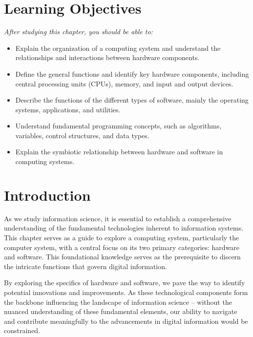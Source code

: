 \documentclass[
  letterpaper,
  DIV=11,
  numbers=noendperiod]{scrreprt}
\providecommand{\tightlist}{%
  \setlength{\itemsep}{0pt}\setlength{\parskip}{0pt}}\usepackage{longtable,booktabs,array}
\begin{document}
\section{Learning Objectives}\label{learning-objectives-3}

\emph{After studying this chapter, you should be able to:}

\begin{itemize}
\tightlist
\item
  Explain the organization of a computing system and understand the
  relationships and interactions between hardware components.
\item
  Define the general functions and identify key hardware components,
  including central processing units (CPUs), memory, and input and
  output devices.
\item
  Describe the functions of the different types of software, mainly the
  operating systems, applications, and utilities.
\item
  Understand fundamental programming concepts, such as algorithms,
  variables, control structures, and data types.
\item
  Explain the symbiotic relationship between hardware and software in
  computing systems.
\end{itemize}

\section{Introduction}\label{introduction-7}

As we study information science, it is essential to establish a
comprehensive understanding of the fundamental technologies inherent to
information systems. This chapter serves as a guide to explore a
computing system, particularly the computer system, with a central focus
on its two primary categories: hardware and software. This foundational
knowledge serves as the prerequisite to discern the intricate functions
that govern digital information.

By exploring the specifics of hardware and software, we pave the way to
identify potential innovations and improvements. As these technological
components form the backbone influencing the landscape of information
science -- without the nuanced understanding of these fundamental
elements, our ability to navigate and contribute meaningfully to the
advancements in digital information would be constrained.
\end{document}
